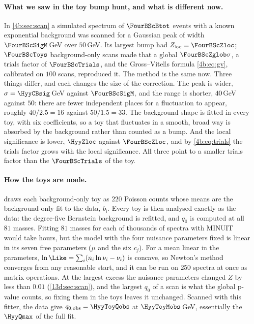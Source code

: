 \paragraph{What we saw in the toy bump hunt, and what is different now.}
In \cref{4b:sec:scan} a simulated spectrum of $\FourBScBtot$ events with a known
exponential background was scanned for a Gaussian peak of width $\FourBScSigM\,$GeV over
$50\,$GeV. Its largest bump had $Z_{\rm loc}=\FourBScZloc$; $\FourBScToys$
background-only scans made that a global $\FourBScZglob\sigma$, a trials factor of
$\FourBScTrials$, and the Gross--Vitells formula \eqref{4b:eq:gv}, calibrated on $100$
scans, reproduced it. The method is the same now. Three things differ, and each changes
the size of the correction. The peak is wider, $\sigma=\HyyCBsig\,$GeV against
$\FourBScSigM$, and the range is shorter, $40\,$GeV against $50$: there are fewer
independent places for a fluctuation to appear, roughly $40/2.5=16$ against $50/1.5=33$.
The background shape is fitted in every toy, with six coefficients, so a toy that
fluctuates in a smooth, broad way is absorbed by the background rather than counted as a
bump. And the local significance is lower, $\HyyZloc$ against $\FourBScZloc$, and by
\eqref{4b:eq:trials} the trials factor grows with the local significance. All three
point to a smaller trials factor than the $\FourBScTrials$ of the toy.

\paragraph{How the toys are made.}
 draws each background-only toy as $220$ Poisson counts
whose means are the background-only fit to the data, $b_i$. Every toy is then analysed
exactly as the data: the degree-five Bernstein background is refitted, and $q_0$ is
computed at all $81$ masses. Fitting $81$ masses for each of thousands of spectra with
MINUIT would take hours, but the model with the four nuisance parameters fixed is linear
in its seven free parameters ($\mu$ and the six $c_j$). For a mean linear in the
parameters, $\ln\Like=\sum_i(n_i\ln\nu_i-\nu_i)$ is concave, so Newton's method converges
from any reasonable start, and it can be run on $250$ spectra at once as matrix
operations. At the largest excess the nuisance parameters changed $Z$ by less than $0.01$
(\cref{13d:sec:scan}), and the largest $q_0$ of a scan is what the global p-value
counts, so fixing them in the toys leaves it unchanged. Scanned with
this fitter, the data give $q_{0,\rm obs}=\HyyToyQobs$ at $\HyyToyMobs\,$GeV, essentially
the $\HyyQmax$ of the full fit.


